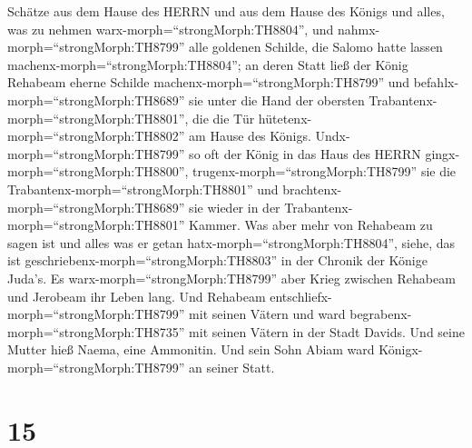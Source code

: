 Schätze aus dem Hause des HERRN und aus dem Hause des Königs und alles,
was zu nehmen warx-morph=``strongMorph:TH8804'', und
nahmx-morph=``strongMorph:TH8799'' alle goldenen Schilde, die Salomo
hatte lassen machenx-morph=``strongMorph:TH8804'';  an
deren Statt ließ der König Rehabeam eherne Schilde
machenx-morph=``strongMorph:TH8799'' und
befahlx-morph=``strongMorph:TH8689'' sie unter die Hand der obersten
Trabantenx-morph=``strongMorph:TH8801'', die die Tür
hütetenx-morph=``strongMorph:TH8802'' am Hause des Königs. 
Undx-morph=``strongMorph:TH8799'' so oft der König in das Haus des HERRN
gingx-morph=``strongMorph:TH8800'', trugenx-morph=``strongMorph:TH8799''
sie die Trabantenx-morph=``strongMorph:TH8801'' und
brachtenx-morph=``strongMorph:TH8689'' sie wieder in der
Trabantenx-morph=``strongMorph:TH8801'' Kammer.  Was aber
mehr von Rehabeam zu sagen ist und alles was er getan
hatx-morph=``strongMorph:TH8804'', siehe, das ist
geschriebenx-morph=``strongMorph:TH8803'' in der Chronik der Könige
Juda's.  Es warx-morph=``strongMorph:TH8799'' aber Krieg
zwischen Rehabeam und Jerobeam ihr Leben lang.  Und
Rehabeam entschliefx-morph=``strongMorph:TH8799'' mit seinen Vätern und
ward begrabenx-morph=``strongMorph:TH8735'' mit seinen Vätern in der
Stadt Davids. Und seine Mutter hieß Naema, eine Ammonitin. Und sein Sohn
Abiam ward Königx-morph=``strongMorph:TH8799'' an seiner Statt.

\hypertarget{section-14}{%
\section{15}\label{section-14}}

